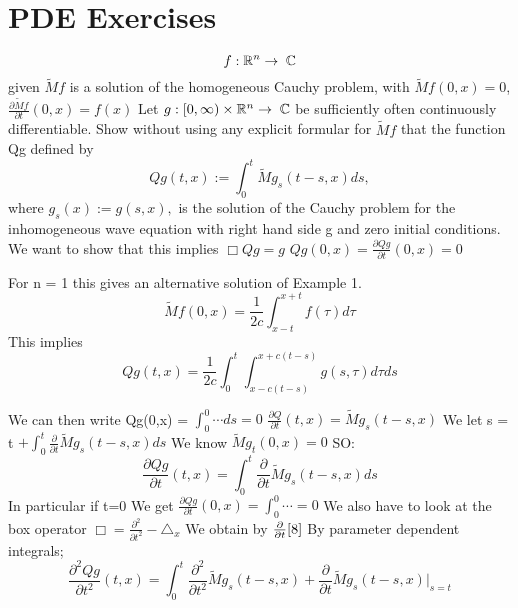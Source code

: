 \section{PDE Exercises}
\begin{equation*}
 f: \mathbb{R}^n \rightarrow \; \mathbb{C}
\end{equation*}
given
$\tilde{M}f$ is a solution of the homogeneous Cauchy problem, with $\tilde{M}f(0,x) = 0$,
$\frac{\partial \tilde{M}f}{\partial t}(0,x) = f(x)$
Let $g:[0,\infty) \times \mathbb{R}^n \rightarrow \; \mathbb{C}$ be sufficiently often continuously differentiable. Show without using any
explicit formular for $\tilde{M}f$ that the function Qg defined by 
\begin{equation*}
 Qg(t,x):= \int^{t}_{0} \tilde{M}g_s(t-s,x)ds, 
\end{equation*}
where $g_s(x):= g(s,x),$ is the solution of the Cauchy problem for the inhomogeneous wave equation with right hand
side g and zero initial conditions. 
We want to show that this implies $\Box Qg = g$
$Qg(0,x)= \frac{\partial Qg}{\partial t}(0,x) = 0$
\newline
\begin{rm}
 For n = 1 this gives an alternative solution of Example 1.
\begin{equation*}
 \tilde{M}f(0,x) = \frac{1}{2c} \int^{x+t}_{x-t}f(\tau)d\tau
\end{equation*}
This implies 
\begin{equation}
 Qg(t,x) = \frac{1}{2c} \int^{t}_{0} \int^{x+c(t-s)}_{x-c(t-s)}g(s,\tau)d\tau ds
\end{equation}

\end{rm}
We can then write Qg(0,x) = $\int_0^0 \cdots ds = 0$
$\frac{\partial Q}{\partial t}(t,x) = \tilde{M} g_s(t-s,x)$ 
We let s = t 
$+\int^t_0 \frac{\partial}{\partial t} \tilde{M}g_s(t-s,x)ds$
We know $\tilde{M}g_t(0,x) =0$
SO: \begin{equation}\label{8}
     \frac{\partial Qg}{\partial t}(t,x) = \int^{t}_0 \frac{\partial}{\partial t} \tilde{M}g_s(t-s,x)ds 
    \end{equation}
In particular if t=0 
We get $\frac{\partial Qg}{\partial t} (0,x) = \int^0_0 \cdots = 0$
We also have to look at the box operator 
$\Box = \frac{\partial^2}{\partial t^2} - \triangle_x$
We obtain by $\frac{\partial}{\partial t}\ref{8}$
By parameter dependent integrals;
\begin{equation*}
 \frac{\partial^2 Qg}{\partial t^2}(t,x) = \int^{t}_0 \frac{\partial^2}{\partial t^2} \tilde{M}g_s(t-s,x) + 
\frac{\partial}{\partial t} \tilde{M}g_s (t-s,x)|_{s=t} 
\end{equation*}
